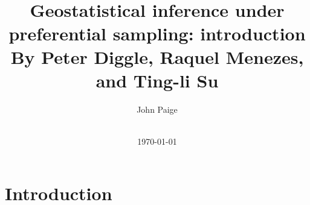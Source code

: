 \documentclass[xcolor=svgnames]{beamer}
\title{~\\~\\Geostatistical inference under preferential sampling: introduction
\\
{\small By Peter Diggle, Raquel Menezes, and Ting-li Su}
}
\author[John Paige]{John Paige}
\date[\today]{\vspace{.3in} \small \\ \today}
\institute[University of Washington] %
{
  \vspace{.1in} \\ Statistics Department\\
{\sc  University of Washington  }
}
\begin{document}
\setlength{\columnsep}{.5cm}


\frame{\titlepage}




\section{Introduction}



\end{document}
